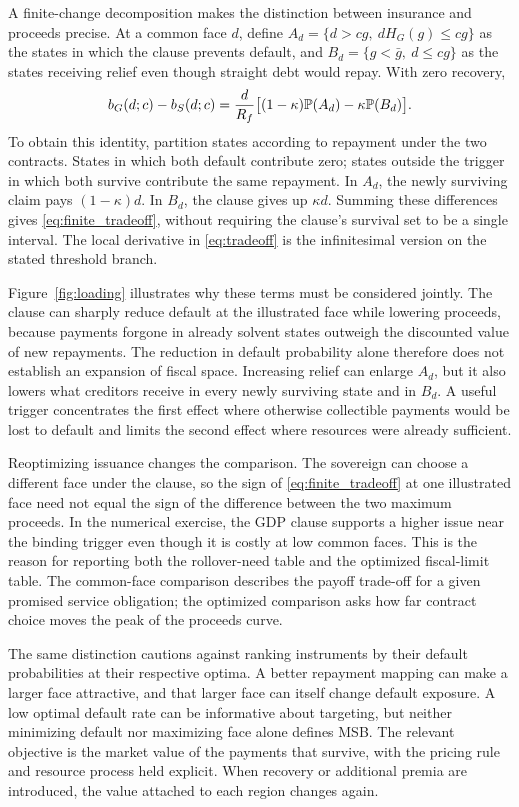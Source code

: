 A finite-change decomposition makes the distinction between insurance and proceeds precise. At a common face $d$, define $A_d=\{d>cg,\ dH_G(g)\le cg\}$ as the states in which the clause prevents default, and $B_d=\{g<\bar g,\ d\le cg\}$ as the states receiving relief even though straight debt would repay. With zero recovery,
\begin{equation}\label{eq:finite_tradeoff}
 b_G(d;c)-b_S(d;c)
 =\frac{d}{R_f}\big[(1-\kappa)\mathbb P(A_d)-\kappa\mathbb P(B_d)\big].
\end{equation}
To obtain this identity, partition states according to repayment under the two contracts. States in which both default contribute zero; states outside the trigger in which both survive contribute the same repayment. In $A_d$, the newly surviving claim pays $(1-\kappa)d$. In $B_d$, the clause gives up $\kappa d$. Summing these differences gives \eqref{eq:finite_tradeoff}, without requiring the clause's survival set to be a single interval. The local derivative in \eqref{eq:tradeoff} is the infinitesimal version on the stated threshold branch.

Figure~\ref{fig:loading} illustrates why these terms must be considered jointly. The clause can sharply reduce default at the illustrated face while lowering proceeds, because payments forgone in already solvent states outweigh the discounted value of new repayments. The reduction in default probability alone therefore does not establish an expansion of fiscal space. Increasing relief can enlarge $A_d$, but it also lowers what creditors receive in every newly surviving state and in $B_d$. A useful trigger concentrates the first effect where otherwise collectible payments would be lost to default and limits the second effect where resources were already sufficient.

Reoptimizing issuance changes the comparison. The sovereign can choose a different face under the clause, so the sign of \eqref{eq:finite_tradeoff} at one illustrated face need not equal the sign of the difference between the two maximum proceeds. In the numerical exercise, the GDP clause supports a higher issue near the binding trigger even though it is costly at low common faces. This is the reason for reporting both the rollover-need table and the optimized fiscal-limit table. The common-face comparison describes the payoff trade-off for a given promised service obligation; the optimized comparison asks how far contract choice moves the peak of the proceeds curve.

The same distinction cautions against ranking instruments by their default probabilities at their respective optima. A better repayment mapping can make a larger face attractive, and that larger face can itself change default exposure. A low optimal default rate can be informative about targeting, but neither minimizing default nor maximizing face alone defines MSB. The relevant objective is the market value of the payments that survive, with the pricing rule and resource process held explicit. When recovery or additional premia are introduced, the value attached to each region changes again.
